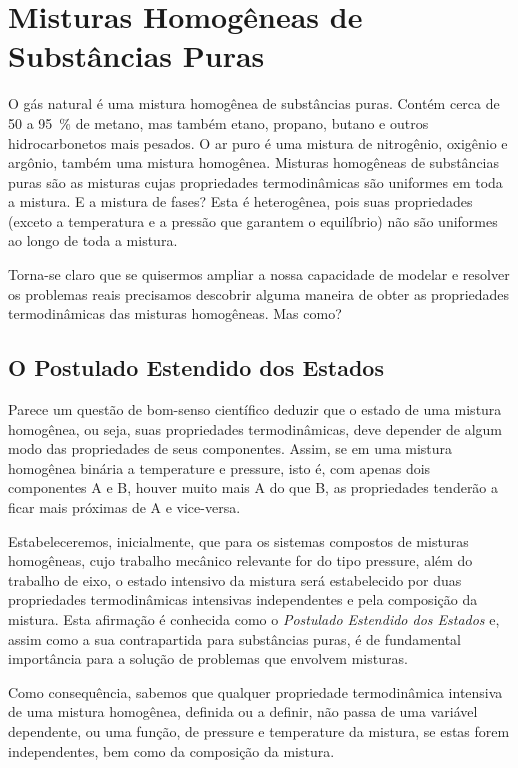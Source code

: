 \chapter{Misturas Homogêneas de Substâncias Puras}
\label{chap:homogeneousMixtures}

    O gás natural é uma mistura homogênea de substâncias puras. Contém cerca de
    \num{50} a \SI{95}{\percent} de metano, mas também etano, propano, butano e
    outros hidrocarbonetos mais pesados. O ar puro é uma mistura de nitrogênio,
    oxigênio e argônio, também uma mistura homogênea. Misturas homogêneas de
    substâncias puras são as misturas cujas propriedades termodinâmicas são
    uniformes em toda a mistura. E a mistura de fases? Esta é heterogênea, pois
    suas propriedades (exceto a temperatura e a pressão que garantem o
    equilíbrio) não são uniformes ao longo de toda a mistura.

    Torna-se claro que se quisermos ampliar a nossa capacidade de modelar e
    resolver os problemas reais precisamos descobrir alguma maneira de obter as
    propriedades termodinâmicas das misturas homogêneas. Mas como?


    \section{O Postulado Estendido dos Estados}
    \label{sec:extendedPostulateOfStates}

    Parece um questão de bom-senso científico deduzir que o estado de uma
    mistura homogênea, ou seja, suas propriedades termodinâmicas, deve depender
    de algum modo das propriedades de seus componentes. Assim, se em uma
    mistura homogênea binária a \gls{temperature} e \gls{pressure}, isto é, com
    apenas dois componentes A e B, houver muito mais A do que B, as
    propriedades tenderão a ficar mais próximas de A e vice-versa.

    Estabeleceremos, inicialmente, que para os sistemas compostos de misturas
    homogêneas, cujo trabalho mecânico relevante for do tipo
    \gls{pressure}, além do trabalho de eixo, o estado
    intensivo da mistura será estabelecido por duas propriedades termodinâmicas
    intensivas independentes e pela composição da mistura. Esta afirmação é
    conhecida como o \emph{Postulado Estendido dos Estados} e, assim como a sua
    contrapartida para substâncias puras, é de fundamental importância para a
    solução de problemas que envolvem misturas.

    Como consequência, sabemos que qualquer propriedade termodinâmica intensiva
    de uma mistura homogênea, definida ou a definir, não passa de uma variável
    dependente, ou uma função, de \gls{pressure} e \gls{temperature} da
    mistura, se estas forem independentes, bem como da composição da mistura.


